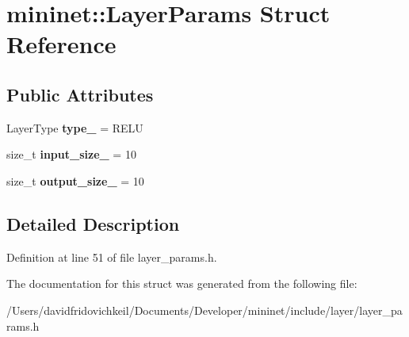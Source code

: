 \hypertarget{structmininet_1_1_layer_params}{}\section{mininet\+:\+:Layer\+Params Struct Reference}
\label{structmininet_1_1_layer_params}
\subsection*{Public Attributes}
\begin{DoxyCompactItemize}
\item 
\hypertarget{structmininet_1_1_layer_params_afe73b1c539544ca3e280d3e5dd222007}{}\label{structmininet_1_1_layer_params_afe73b1c539544ca3e280d3e5dd222007} 
Layer\+Type {\bfseries type\+\_\+} = R\+E\+LU
\item 
\hypertarget{structmininet_1_1_layer_params_af572460aed17881f265fefec48bdba76}{}\label{structmininet_1_1_layer_params_af572460aed17881f265fefec48bdba76} 
size\+\_\+t {\bfseries input\+\_\+size\+\_\+} = 10
\item 
\hypertarget{structmininet_1_1_layer_params_ab3c57b124160125c98e5a960cf653efc}{}\label{structmininet_1_1_layer_params_ab3c57b124160125c98e5a960cf653efc} 
size\+\_\+t {\bfseries output\+\_\+size\+\_\+} = 10
\end{DoxyCompactItemize}


\subsection{Detailed Description}


Definition at line 51 of file layer\+\_\+params.\+h.



The documentation for this struct was generated from the following file\+:\begin{DoxyCompactItemize}
\item 
/\+Users/davidfridovichkeil/\+Documents/\+Developer/mininet/include/layer/layer\+\_\+params.\+h\end{DoxyCompactItemize}

